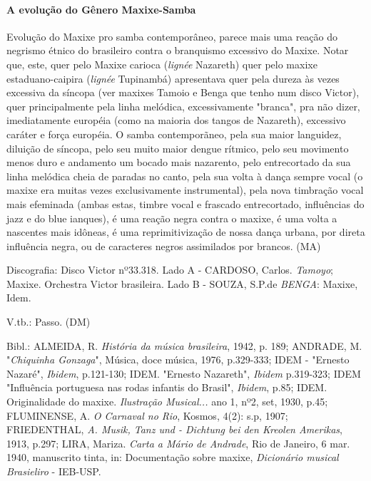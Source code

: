 \paragraph{A evolução do Gênero Maxixe-Samba}

Evolução do Maxixe pro samba contemporâneo, parece mais uma reação do
negrismo étnico do brasileiro contra o branquismo excessivo do Maxixe.
Notar que, este, quer pelo Maxixe carioca (\emph{lignée} Nazareth) quer
pelo maxixe estaduano-caipira (\emph{lignée} Tupinambá) apresentava quer
pela dureza às vezes excessiva da síncopa (ver maxixes Tamoio e Benga
que tenho num disco Victor), quer principalmente pela linha melódica,
excessivamente "branca", pra não dizer, imediatamente européia (como na
maioria dos tangos de Nazareth), excessivo caráter e força européia. O
samba contemporãneo, pela sua maior languidez, diluição de síncopa, pelo
seu muito maior dengue rítmico, pelo seu movimento menos duro e
andamento um bocado mais nazarento, pelo entrecortado da sua linha
melódica cheia de paradas no canto, pela sua volta à dança sempre vocal
(o maxixe era muitas vezes exclusivamente instrumental), pela nova
timbração vocal mais efeminada (ambas estas, timbre vocal e frascado
entrecortado, influências do jazz e do blue ianques), é uma reação negra
contra o maxixe, é uma volta a nascentes mais idôneas, é uma
reprimitivização de nossa dança urbana, por direta influência negra, ou
de caracteres negros assimilados por brancos. (MA)

Discografia: Disco Victor nº33.318. Lado A - CARDOSO, Carlos.
\emph{Tamoyo}; Maxixe. Orchestra Victor brasileira. Lado B - SOUZA,
S.P.de \emph{BENGA}: Maxixe, Idem.

V.tb.: Passo. (DM)

Bibl.: ALMEIDA, R. \emph{História da música brasileira}, 1942, p. 189;
ANDRADE, M. "\emph{Chiquinha Gonzaga}", Música, doce música, 1976,
p.329-333; IDEM - "Ernesto Nazaré", \emph{Ibidem}, p.121-130; IDEM.
"Ernesto Nazareth", \emph{Ibidem} p.319-323; IDEM "Influência portuguesa
nas rodas infantis do Brasil", \emph{Ibidem}, p.85; IDEM. Originalidade
do maxixe. \emph{Ilustração Musical...} ano 1, nº2, set, 1930, p.45;
FLUMINENSE, A. \emph{O Carnaval no Rio}, Kosmos, 4(2): s.p, 1907;
FRIEDENTHAL, \emph{A. Musik, Tanz und - Dichtung bei den Kreolen
Amerikas}, 1913, p.297; LIRA, Mariza. \emph{Carta a Mário de Andrade},
Rio de Janeiro, 6 mar. 1940, manuscrito tinta, in: Documentação sobre
maxixe, \emph{Dicionário musical Brasieliro} - IEB-USP.

